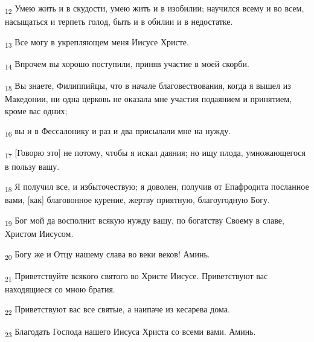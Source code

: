 \begin{tcolorbox}
\textsubscript{12} Умею жить и в скудости, умею жить и в изобилии; научился всему и во всем, насыщаться и терпеть голод, быть и в обилии и в недостатке.
\end{tcolorbox}
\begin{tcolorbox}
\textsubscript{13} Все могу в укрепляющем меня Иисусе Христе.
\end{tcolorbox}
\begin{tcolorbox}
\textsubscript{14} Впрочем вы хорошо поступили, приняв участие в моей скорби.
\end{tcolorbox}
\begin{tcolorbox}
\textsubscript{15} Вы знаете, Филиппийцы, что в начале благовествования, когда я вышел из Македонии, ни одна церковь не оказала мне участия подаянием и принятием, кроме вас одних;
\end{tcolorbox}
\begin{tcolorbox}
\textsubscript{16} вы и в Фессалонику и раз и два присылали мне на нужду.
\end{tcolorbox}
\begin{tcolorbox}
\textsubscript{17} [Говорю это] не потому, чтобы я искал даяния; но ищу плода, умножающегося в пользу вашу.
\end{tcolorbox}
\begin{tcolorbox}
\textsubscript{18} Я получил все, и избыточествую; я доволен, получив от Епафродита посланное вами, [как] благовонное курение, жертву приятную, благоугодную Богу.
\end{tcolorbox}
\begin{tcolorbox}
\textsubscript{19} Бог мой да восполнит всякую нужду вашу, по богатству Своему в славе, Христом Иисусом.
\end{tcolorbox}
\begin{tcolorbox}
\textsubscript{20} Богу же и Отцу нашему слава во веки веков! Аминь.
\end{tcolorbox}
\begin{tcolorbox}
\textsubscript{21} Приветствуйте всякого святого во Христе Иисусе. Приветствуют вас находящиеся со мною братия.
\end{tcolorbox}
\begin{tcolorbox}
\textsubscript{22} Приветствуют вас все святые, а наипаче из кесарева дома.
\end{tcolorbox}
\begin{tcolorbox}
\textsubscript{23} Благодать Господа нашего Иисуса Христа со всеми вами. Аминь.
\end{tcolorbox}
